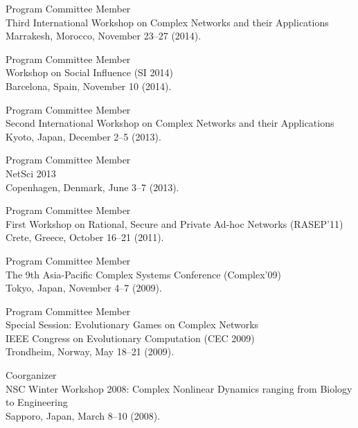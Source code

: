\documentclass[11pt,letter]{article}
\renewenvironment{itemize}{
  \begin{list}{}{
    \setlength{\leftmargin}{1.5em}
    \setlength{\itemsep}{0.25em}
    \setlength{\parskip}{0pt}
    \setlength{\parsep}{0.25em}
  }
}{
  \end{list}
}
\begin{document}
\begin{itemize}
\item Program Committee Member\\
Third International Workshop on Complex Networks and their Applications\\
Marrakesh, Morocco, November 23--27 (2014).

\item Program Committee Member\\
Workshop on Social Influence (SI 2014)\\
Barcelona, Spain, November 10 (2014).

\item Program Committee Member\\
Second International Workshop on Complex Networks and their Applications\\
Kyoto, Japan, December 2--5 (2013).

\item Program Committee Member\\
NetSci 2013\\
Copenhagen, Denmark, June 3--7 (2013).

\item Program Committee Member\\
First Workshop on Rational, Secure and Private Ad-hoc Networks (RASEP'11)\\
Crete, Greece, October 16--21 (2011).

\item Program Committee Member\\
The 9th Asia-Pacific Complex Systems Conference (Complex'09)\\
Tokyo, Japan, November 4--7 (2009).

\item Program Committee Member\\
Special Session: Evolutionary Games on Complex Networks\\
IEEE Congress on Evolutionary Computation (CEC 2009)\\
Trondheim, Norway, May 18--21 (2009).

\item
Coorganizer\\
NSC Winter Workshop 2008: Complex Nonlinear Dynamics ranging from Biology to Engineering\\
Sapporo, Japan, March 8--10 (2008).


\end{itemize}
\end{document}
